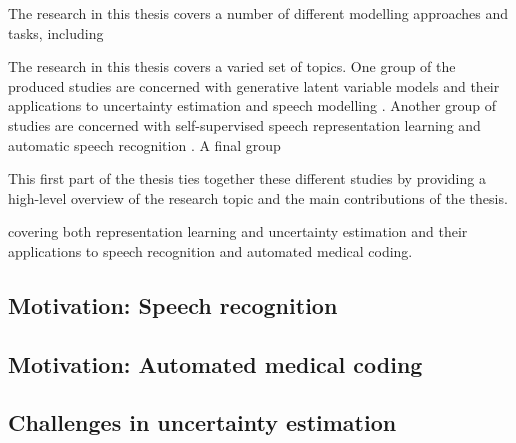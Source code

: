 


The research in this thesis covers a number of different modelling approaches and tasks, including 


The research in this thesis covers a varied set of topics. One group of the produced studies are concerned with generative latent variable models and their applications to uncertainty estimation and speech modelling \cite{havtorn_hierarchical_2021,havtorn_benchmarking_2022,bergamin_modelagnostic_2022}. Another group of studies are concerned with self-supervised speech representation learning and automatic speech recognition \cite{borgholt_scaling_2021,borgholt_we_2021,mohamed_selfsupervised_2022,borgholt_brief_2022}. A final group 

This first part of the thesis ties together these different studies by providing a high-level overview of the research topic and the main contributions of the thesis.


covering both representation learning and uncertainty estimation and their applications to speech recognition and automated medical coding. 



\subsection{Motivation: Speech recognition}


\subsection{Motivation: Automated medical coding}


\subsection{Challenges in uncertainty estimation}




